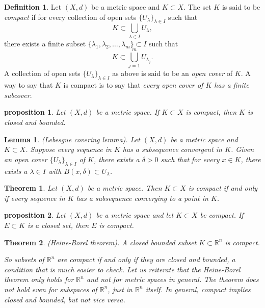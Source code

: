 \documentclass{article}
\newtheorem{theorem}{Theorem}[section]
\newtheorem{lemma}{Lemma}[section]
\newtheorem{proposition}{Proposition}[section]
\newtheorem{proposition}{proposition}[section]
\theoremstyle{definition}
\newtheorem{definition}{Definition}[section]
\theoremstyle{remark}
\begin{document}
\begin{definition} \label{def:compact_set}
Let \( (X, d) \) be a metric space and \( K \subset X \). The set \( K \) is said to be \textit{compact} if for every collection of open sets \( \{ U_{\lambda} \}_{\lambda \in I} \) such that
\[
K \subset \bigcup_{\lambda \in I} U_{\lambda},
\]
there exists a finite subset \( \{\lambda_1, \lambda_2, \dots, \lambda_m\} \subset I \) such that
\[
K \subset \bigcup_{j=1}^{m} U_{\lambda_j}.
\]
A collection of open sets \( \{U_{\lambda} \}_{\lambda \in I} \) as above is said to be an \textit{open cover} of \( K \). A way to say that \( K \) is compact is to say that \textit{every open cover of \( K \) has a finite subcover}.
\end{definition}

\begin{proposition} \label{prop:compact_closed_bounded}
Let \( (X, d) \) be a metric space. If \( K \subset X \) is compact, then \( K \) is closed and bounded.
\end{proposition}

\begin{lemma} \label{lem:lebesgue_covering}
(Lebesgue covering lemma). Let \( (X, d) \) be a metric space and \( K \subset X \). Suppose every sequence in \( K \) has a subsequence convergent in \( K \). Given an open cover \( \{U_{\lambda}\}_{\lambda \in I} \) of \( K \), there exists a \( \delta > 0 \) such that for every \( x \in K \), there exists a \( \lambda \in I \) with \( B(x, \delta) \subset U_{\lambda} \).
\end{lemma}

\begin{theorem} \label{thm:compactness_sequential}
Let \( (X, d) \) be a metric space. Then \( K \subset X \) is compact if and only if every sequence in \( K \) has a subsequence converging to a point in \( K \).
\end{theorem}

\begin{proposition} \label{prop:compact_closed_subset}
Let \( (X, d) \) be a metric space and let \( K \subset X \) be compact. If \( E \subset K \) is a closed set, then \( E \) is compact.
\end{proposition}

\begin{theorem} \label{thm:heine_borel}
(Heine-Borel theorem). A \textit{closed bounded} subset \( K \subset \mathbb{R}^n \) is compact.

So subsets of \( \mathbb{R}^n \) are compact if and only if they are closed and bounded, a condition that is much easier to check. Let us reiterate that the Heine-Borel theorem only holds for \( \mathbb{R}^n \) and not for metric spaces in general. The theorem does not hold even for subspaces of \( \mathbb{R}^n \), just in \( \mathbb{R}^n \) itself. In general, compact implies closed and bounded, but not vice versa.
\end{theorem}
\end{document}
